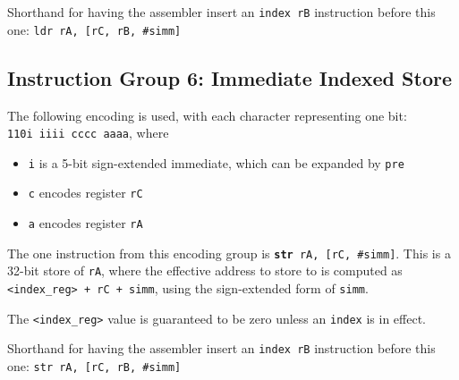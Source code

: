 \documentclass{article}
\begin{document}
	Shorthand for having the assembler insert an \texttt{index rB}
	instruction before this one: \texttt{ldr rA, [rC, rB, \#simm]}


	\subsection{Instruction Group 6: Immediate Indexed Store}
	The following encoding is used, with each character representing one
	bit: \\
	\texttt{110i iiii cccc aaaa}, where

	\singlespacing
	\begin{itemize}
		\item \texttt{i} is a 5-bit sign-extended immediate, which can
		be expanded by \texttt{pre}  
		\item \texttt{c} encodes register \texttt{rC}
		\item \texttt{a} encodes register \texttt{rA}
	\end{itemize}
	\doublespacing

	The one instruction from this encoding group is
	\texttt{\textbf{str} rA, [rC, \#simm]}.
	This is a 32-bit store of \texttt{rA}, where the effective address to
	store to is computed as \texttt{<index\_reg> + rC + simm}, using the
	sign-extended form of \texttt{simm}.

	The \texttt{<index\_reg>} value is guaranteed to be zero unless an
	\texttt{index} is in effect.

	Shorthand for having the assembler insert an \texttt{index rB}
	instruction before this one: \texttt{str rA, [rC, rB, \#simm]}



\end{document}
